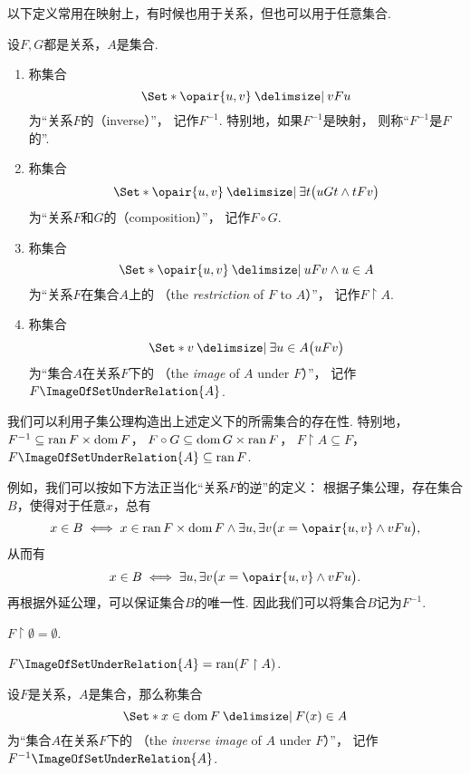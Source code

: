 以下定义常用在映射上，有时候也用于关系，但也可以用于任意集合.
\begin{definition}
设\(F,G\)都是关系，\(A\)是集合.
\begin{enumerate}
	\item 称集合\[
		\Set*{ \opair{u,v} \given v F u }
	\]为“关系\(F\)的（inverse）”，
	记作\(F^{-1}\).
	特别地，如果\(F^{-1}\)是映射，
	则称“\(F^{-1}\)是\(F\)的”.

	\item 称集合\[
		\Set*{ \opair{u,v} \given \exists t \bigl( u G t \land t F v \bigr) }
	\]为“关系\(F\)和\(G\)的（composition）”，
	记作\(F \circ G\).

	\item 称集合\[
		\Set*{ \opair{u,v} \given u F v \land u \in A }
	\]为“关系\(F\)在集合\(A\)上的%
	（the \emph{restriction} of \(F\) to \(A\)）”，
	记作\(F \upharpoonright A\).

	\item 称集合\[
		\Set*{ v \given \exists u \in A \bigl( u F v \bigr) }
	\]为“集合\(A\)在关系\(F\)下的%
	（the \emph{image} of \(A\) under \(F\)）”，
	记作\(F\ImageOfSetUnderRelation{A}\).
\end{enumerate}
\end{definition}

我们可以利用子集公理构造出上述定义下的所需集合的存在性.
特别地，
\(F^{-1} \subseteq \operatorname{ran} F \times \operatorname{dom} F\)，
\(F \circ G \subseteq \operatorname{dom} G \times \operatorname{ran} F\)，
\(F \upharpoonright A \subseteq F\)，
\(F\ImageOfSetUnderRelation{A} \subseteq \ran F\).

例如，我们可以按如下方法正当化“关系\(F\)的逆”的定义：
根据子集公理，存在集合\(B\)，使得对于任意\(x\)，总有\[
	x \in B \iff
	x \in \ran F \times \dom F
	\land
	\exists u, \exists v \bigl( x = \opair{u,v} \land v F u \bigr),
\]
从而有\[
	x \in B \iff
	\exists u, \exists v \bigl( x = \opair{u,v} \land v F u \bigr).
\]
再根据外延公理，可以保证集合\(B\)的唯一性.
因此我们可以将集合\(B\)记为\(F^{-1}\).

\begin{theorem}
\(F \upharpoonright \emptyset = \emptyset\).
\end{theorem}

\begin{theorem}
\(F\ImageOfSetUnderRelation{A} = \ran(F \upharpoonright A)\).
\end{theorem}

\begin{definition}
设\(F\)是关系，\(A\)是集合，那么称集合\[
	\Set*{ x \in \dom F \given F(x) \in A }
\]为“集合\(A\)在关系\(F\)下的%
（the \emph{inverse image} of \(A\) under \(F\)）”，
记作\(F^{-1}\ImageOfSetUnderRelation{A}\).
\end{definition}


